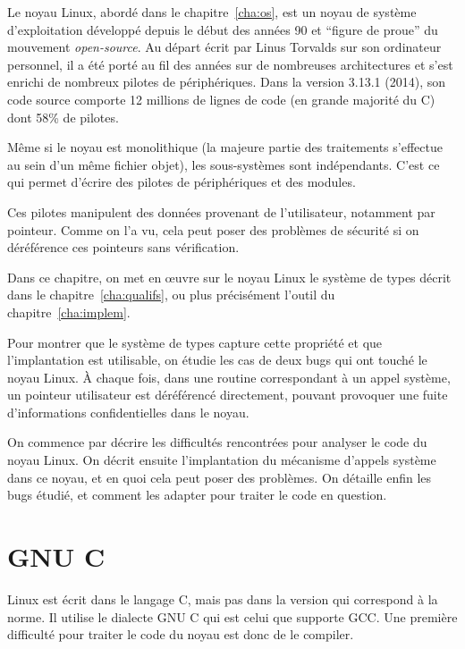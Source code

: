 
Le noyau Linux, abordé dans le chapitre~\ref{cha:os}, est un noyau de système
d'exploitation développé depuis le début des années 90 et \enquote{figure de
proue} du mouvement \emph{open-source}. Au départ écrit par Linus Torvalds sur
son ordinateur personnel, il a été porté au fil des années sur de nombreuses
architectures et s'est enrichi de nombreux pilotes de périphériques. Dans la
version 3.13.1 (2014), son code source comporte 12 millions de lignes de code
(en grande majorité du C) dont 58\% de pilotes.


Même si le noyau est monolithique (la majeure partie des traitements s'effectue
au sein d'un même fichier objet), les sous-systèmes sont indépendants. C'est ce
qui permet d'écrire des pilotes de périphériques et des modules.

Ces pilotes manipulent des données provenant de l'utilisateur, notamment par
pointeur. Comme on l'a vu, cela peut poser des problèmes de sécurité si on
déréférence ces pointeurs sans vérification.

Dans ce chapitre, on met en œuvre sur le noyau Linux le système de types décrit
dans le chapitre~\ref{cha:qualifs}, ou plus précisément l'outil \ptrtype du
chapitre~\ref{cha:implem}.

Pour montrer que le système de types capture cette propriété et que
l'implantation est utilisable, on étudie les cas de deux bugs qui ont touché le
noyau Linux. À chaque fois, dans une routine correspondant à un appel système,
un pointeur utilisateur est déréférencé directement, pouvant provoquer une fuite
d'informations confidentielles dans le noyau.

On commence par décrire les difficultés rencontrées pour analyser le code du
noyau Linux. On décrit ensuite l'implantation du mécanisme d'appels système dans
ce noyau, et en quoi cela peut poser des problèmes. On détaille enfin les bugs
étudié, et comment les adapter pour traiter le code en question.

\section{GNU C}
\label{sec:gnuc}

Linux est écrit dans le langage C, mais pas dans la version qui correspond à la
norme. Il utilise le dialecte GNU C qui est celui que supporte GCC. Une première
difficulté pour traiter le code du noyau est donc de le compiler.

